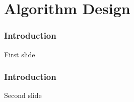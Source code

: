 \section{Algorithm Design}

\begin{frame}
    \frametitle{Introduction}

    First slide

\end{frame}

\begin{frame}
    \frametitle{Introduction}

    Second slide

\end{frame}